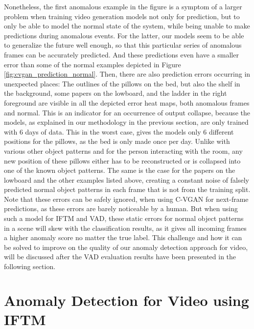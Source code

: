 Nonetheless, the first anomalous example in the figure is a symptom of a larger problem when training video generation models not only for prediction, but to only be able to model the normal state of the system, while being unable to make predictions during anomalous events. For the latter, our models seem to be able to generalize the future well enough, so that this particular series of anomalous frames can be accurately predicted. And these predictions even have a smaller error than some of the normal examples depicted in Figure \ref{fig:cvgan_prediction_normal}. Then, there are also prediction errors occurring in unexpected places: The outlines of the pillows on the bed, but also the shelf in the background, some papers on the lowboard, and the ladder in the right foreground are visible in all the depicted error heat maps, both anomalous frames and normal. This is an indicator for an occurrence of output collapse, because the models, as explained in our methodology in the previous section, are only trained with $6$ days of data. This in the worst case, gives the models only $6$ different positions for the pillows, as the bed is only made once per day. Unlike with various other object patterns and for the person interacting with the room, any new position of these pillows either has to be reconstructed or is collapsed into one of the known object patterns. The same is the case for the papers on the lowboard and the other examples listed above, creating a constant noise of falsely predicted normal object patterns in each frame that is not from the training split. Note that these errors can be safely ignored, when using C-VGAN for next-frame predictions, as these errors are barely noticeable by a human. But when using such a model for IFTM and VAD, these static errors for normal object patterns in a scene will skew with the classification results, as it gives all incoming frames a higher anomaly score no matter the true label. This challenge and how it can be solved to improve on the quality of our anomaly detection approach for video, will be discussed after the VAD evaluation results have been presented in the following section.



\section{Anomaly Detection for Video using IFTM} \label{sec:vad_eval}

